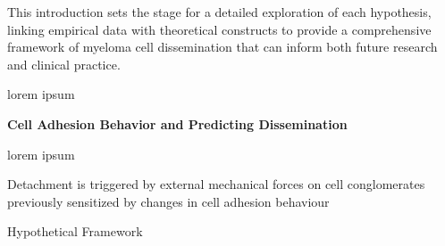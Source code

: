 This introduction sets the stage for a detailed exploration of each hypothesis,
linking empirical data with theoretical constructs to provide a comprehensive
framework of myeloma cell dissemination that can inform both future research and
clinical practice.


\label{sec:discussion_order_adhesion}%
lorem ipsum


\textbf{Cell Adhesion Behavior and Predicting Dissemination}



%
\label{sec:discussion_dynamic_changes_aggressive_hallmark}%
lorem ipsum




\label{sec:discussion_diversity_patients_cell_lines}%


%
\label{sec:discussion_detachment_mechanical_forces}%

Detachment is triggered by external mechanical forces on cell
conglomerates previously sensitized by changes in cell adhesion behaviour





Hypothetical Framework




